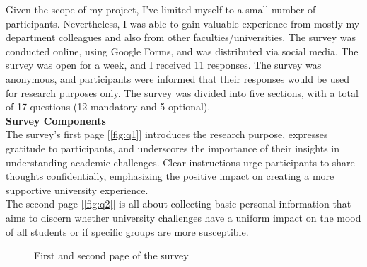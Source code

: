 \documentclass[11pt]{report}
\begin{document}
Given the scope of my project, I've limited myself to a small number of participants. Nevertheless, I was able to gain valuable experience from mostly my department colleagues and also from other faculties/universities. The survey was conducted online, using Google Forms, and was distributed via social media. The survey was open for a week, and I received 11 responses. The survey was anonymous, and participants were informed that their responses would be used for research purposes only. The survey was divided into five sections, with a total of 17 questions (12 mandatory and 5 optional).\vspace{5mm} \\
\textbf{Survey Components} \\
The survey's first page [\ref{fig:q1}] introduces the research purpose, expresses gratitude to participants, and underscores the importance of their insights in understanding academic challenges. Clear instructions urge participants to share thoughts confidentially, emphasizing the positive impact on creating a more supportive university experience.\vspace{5mm} \\
The second page [\ref{fig:q2}] is all about collecting basic personal information that aims to discern whether university challenges have a uniform impact on the mood of all students or if specific groups are more susceptible.
\begin{figure}[h!]
    \centering
    \hfill
    \caption{First and second page of the survey}
\end{figure} \\
\end{document}
